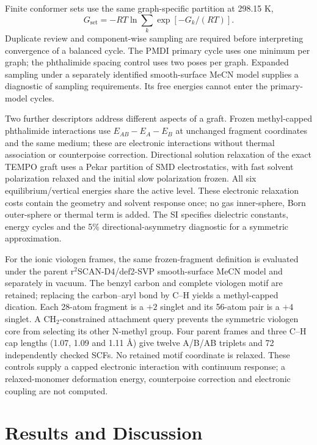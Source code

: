 \documentclass[11pt]{article}
\begin{document}
Finite conformer sets use the same graph-specific partition at 298.15 K,
\begin{equation}
G_{\mathrm{set}}=-RT\ln\sum_k\exp[-G_k/(RT)].
\end{equation}
Duplicate review and component-wise sampling are required before interpreting convergence of a balanced cycle. The PMDI primary cycle uses one minimum per graph; the phthalimide spacing control uses two poses per graph. Expanded sampling under a separately identified smooth-surface MeCN model supplies a diagnostic of sampling requirements. Its free energies cannot enter the primary-model cycles.

Two further descriptors address different aspects of a graft. Frozen methyl-capped phthalimide interactions use $E_{AB}-E_A-E_B$ at unchanged fragment coordinates and the same medium; these are electronic interactions without thermal association or counterpoise correction. Directional solution relaxation of the exact TEMPO graft uses a Pekar partition of SMD electrostatics, with fast solvent polarization relaxed and the initial slow polarization frozen.\cite{you2015nonequilibrium} All six equilibrium/vertical energies share the active level. These electronic relaxation costs contain the geometry and solvent response once; no gas inner-sphere, Born outer-sphere or thermal term is added. The SI specifies dielectric constants, energy cycles and the 5\% directional-asymmetry diagnostic for a symmetric approximation.

For the ionic viologen frames, the same frozen-fragment definition is evaluated under the parent r$^2$SCAN-D4/def2-SVP smooth-surface MeCN model and separately in vacuum. The benzyl carbon and complete viologen motif are retained; replacing the carbon--aryl bond by C--H yields a methyl-capped dication. Each 28-atom fragment is a $+2$ singlet and its 56-atom pair is a $+4$ singlet. A CH$_2$-constrained attachment query prevents the symmetric viologen core from selecting its other N-methyl group. Four parent frames and three C--H cap lengths (1.07, 1.09 and 1.11 \AA) give twelve A/B/AB triplets and 72 independently checked SCFs. No retained motif coordinate is relaxed. These controls supply a capped electronic interaction with continuum response; a relaxed-monomer deformation energy, counterpoise correction and electronic coupling are not computed.

\section{Results and Discussion}
\end{document}
